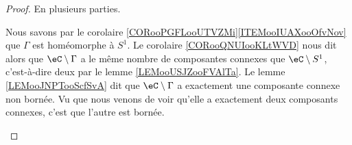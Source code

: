 \begin{proof}
	En plusieurs parties.
	\begin{subproof}
		Nous savons par le corolaire \ref{CORooPGFLooUTVZMi}\ref{ITEMooIUAXooOfvNov} que \( \Gamma\) est homéomorphe à \( S^1\). Le corolaire \ref{CORooQNUIooKLtWVD} nous dit alors que \( \eC\setminus \Gamma\) a le même nombre de composantes connexes que \( \eC\setminus S^1\), c'est-à-dire deux par le lemme \ref{LEMooUSJZooFVAlTa}.
		Le lemme \ref{LEMooJNPTooScfSvA} dit que \( \eC\setminus \Gamma\) a exactement une composante connexe non bornée. Vu que nous venons de voir qu'elle a exactement deux composants connexes, c'est que l'autre est bornée.
	\end{subproof}
\end{proof}
